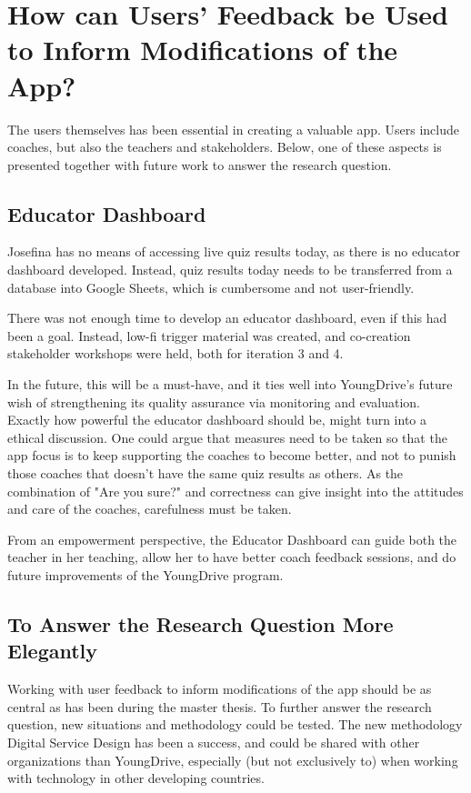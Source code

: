 \section{How can Users' Feedback be Used to Inform Modifications of the App?}

The users themselves has been essential in creating a valuable app. Users include coaches, but also the teachers and stakeholders. Below, one of these aspects is presented together with future work to answer the research question.

\subsection{Educator Dashboard}
Josefina has no means of accessing live quiz results today, as there is no educator dashboard developed. Instead, quiz results today needs to be transferred from a database into Google Sheets, which is cumbersome and not user-friendly.

There was not enough time to develop an educator dashboard, even if this had been a goal. Instead, low-fi trigger material was created, and co-creation stakeholder workshops were held, both for iteration 3 and 4.

In the future, this will be a must-have, and it ties well into YoungDrive's future wish of strengthening its quality assurance via monitoring and evaluation. Exactly how powerful the educator dashboard should be, might turn into a ethical discussion. One could argue that measures need to be taken so that the app focus is to keep supporting the coaches to become better, and not to punish those coaches that doesn't have the same quiz results as others. As the combination of "Are you sure?" and correctness can give insight into the attitudes and care of the coaches, carefulness must be taken.

From an empowerment perspective, the Educator Dashboard can guide both the teacher in her teaching, allow her to have better coach feedback sessions, and do future improvements of the YoungDrive program.

\subsection{To Answer the Research Question More Elegantly}
Working with user feedback to inform modifications of the app should be as central as has been during the master thesis. To further answer the research question, new situations and methodology could be tested. The new methodology Digital Service Design has been a success, and could be shared with other organizations than YoungDrive, especially (but not exclusively to) when working with technology in other developing countries.

